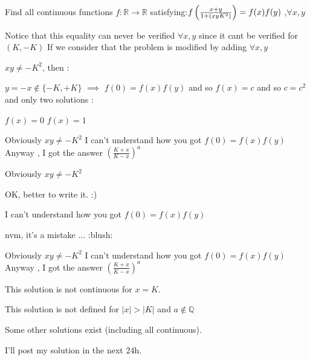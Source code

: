 \begin{solution}
	\begin{tcolorbox}Find all continuous functions $ f: \mathbb{R} \to \mathbb{R}$ satisfying:$ f\left( {\frac {{x + y}} {{1 + (xy\/K^2 )}}} \right) = f(x)f(y)$ ,$ \forall x,y$\end{tcolorbox}

Notice that this equality can never be verified $ \forall x,y$ since it cant be verified for $ (K,-K)$
If we consider that the problem is modified by adding $ \forall x,y$  $ xy\neq -K^2$, then :

$ y=-x\notin\{-K,+K\}$ $ \implies$ $ f(0)=f(x)f(y)$ and so $ f(x)=c$ and so $ c=c^2$ and only two solutions :

$ f(x)=0$
$ f(x)=1$
\end{solution}



\begin{solution}
	Obviously $ xy \ne  - K^2$
I can't understand how you got $ f(0)=f(x)f(y)$
Anyway , I got the answer $ \left( {\frac{{K + x}}
{{K - x}}} \right)^a$
\end{solution}



\begin{solution}
	\begin{tcolorbox}Obviously $ xy \ne - K^2$\end{tcolorbox}
OK, better to write it.
:)
\begin{tcolorbox}
I can't understand how you got $ f(0) = f(x)f(y)$\end{tcolorbox}

nvm, it's a mistake ...  :blush:
\end{solution}



\begin{solution}
	\begin{tcolorbox}Obviously $ xy \ne - K^2$
I can't understand how you got $ f(0) = f(x)f(y)$
Anyway , I got the answer $ \left( {\frac {{K + x}} {{K - x}}} \right)^a$\end{tcolorbox}

This solution is not continuous for $ x = K$.

This solution is not defined for $ |x| > |K|$ and $ a\notin\mathbb Q$

Some other solutions exist (including all continuous).

I'll post my solution in the next 24h.
\end{solution}



